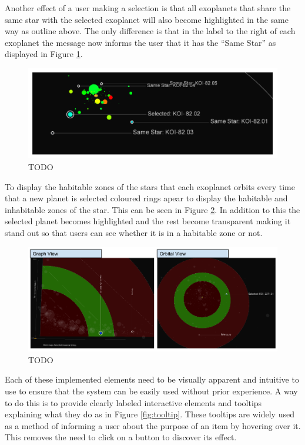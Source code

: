 Another effect of a user making a selection is that all exoplanets that share
the same star with the selected exoplanet will also become highlighted in the
same way as outline above. The only difference is that in the label to the right
of each exoplanet the message now informs the user that it has the ``Same
Star'' as displayed in Figure \ref{fig:sameStar}.

\begin{figure}[H]
  \centering
      \includegraphics[width=1\textwidth]{images/sameStar.png}
  \caption{TODO~}  
    \label{fig:sameStar}
\end{figure}



To display the habitable zones of the stars that each exoplanet orbits every
time that a new planet is selected coloured rings apear to display the habitable
and inhabitable zones of the star. This can be seen in Figure
\ref{fig:habitable}. In addition to this the selected planet becomes highlighted
and the rest become transparent making it stand out so that users can see
whether it is in a habitable zone or not.

\begin{figure}[H]
  \centering
      \includegraphics[width=1\textwidth]{images/habitable.png}
  \caption{TODO~}  
    \label{fig:habitable}
\end{figure}

Each of these implemented elements need to be visually apparent and intuitive to
use to ensure that the system can be
easily used without prior experience. A way to do this is to provide clearly
labeled interactive elements and tooltips explaining what they
do as in Figure \ref{fig:tooltip}. These tooltips are widely used as a method of
informing a
user about the purpose of an item by hovering over it. This removes the need to
click on a button to discover its effect.

